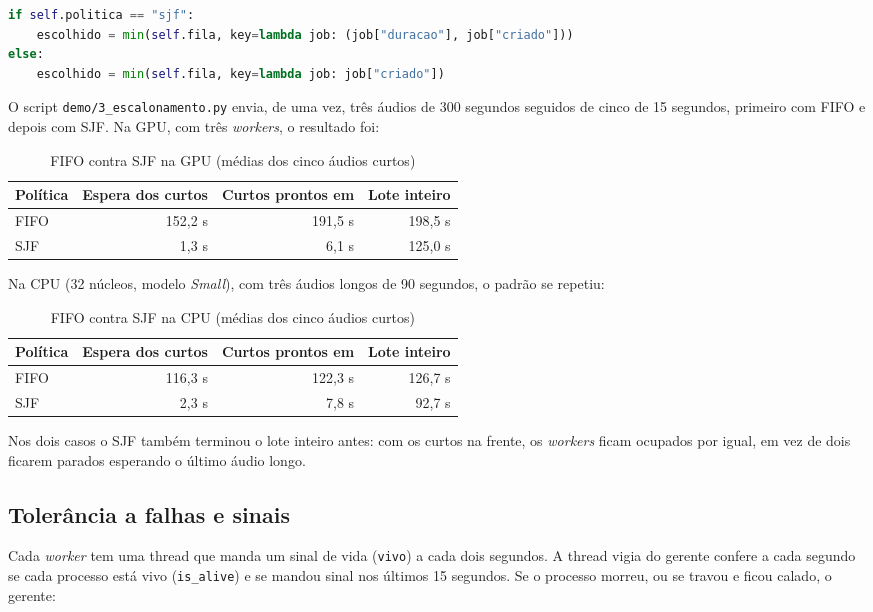 \documentclass[12pt,a4paper]{article}
\begin{document}
\begin{lstlisting}[language=Python]
if self.politica == "sjf":
    escolhido = min(self.fila, key=lambda job: (job["duracao"], job["criado"]))
else:
    escolhido = min(self.fila, key=lambda job: job["criado"])
\end{lstlisting}

O script \texttt{demo/3\_escalonamento.py} envia, de uma vez, três áudios de 300 segundos
seguidos de cinco de 15 segundos, primeiro com FIFO e depois com SJF. Na GPU, com três
\emph{workers}, o resultado foi:

\begin{table}[H]
\centering
\begin{tabular}{@{}lrrr@{}}
\toprule
\textbf{Política} & \textbf{Espera dos curtos} & \textbf{Curtos prontos em} & \textbf{Lote inteiro} \\
\midrule
FIFO & 152,2 s & 191,5 s & 198,5 s \\
SJF  &   1,3 s &   6,1 s & 125,0 s \\
\bottomrule
\end{tabular}
\caption{FIFO contra SJF na GPU (médias dos cinco áudios curtos)}
\end{table}

Na CPU (32 núcleos, modelo \emph{Small}), com três áudios longos de 90 segundos, o padrão se
repetiu:

\begin{table}[H]
\centering
\begin{tabular}{@{}lrrr@{}}
\toprule
\textbf{Política} & \textbf{Espera dos curtos} & \textbf{Curtos prontos em} & \textbf{Lote inteiro} \\
\midrule
FIFO & 116,3 s & 122,3 s & 126,7 s \\
SJF  &   2,3 s &   7,8 s &  92,7 s \\
\bottomrule
\end{tabular}
\caption{FIFO contra SJF na CPU (médias dos cinco áudios curtos)}
\end{table}

Nos dois casos o SJF também terminou o lote inteiro antes: com os curtos na frente, os
\emph{workers} ficam ocupados por igual, em vez de dois ficarem parados esperando o último
áudio longo.

\subsection{Tolerância a falhas e sinais}
Cada \emph{worker} tem uma thread que manda um sinal de vida (\texttt{vivo}) a cada dois
segundos. A thread vigia do gerente confere a cada segundo se cada processo está vivo
(\texttt{is\_alive}) e se mandou sinal nos últimos 15 segundos. Se o processo morreu, ou se
travou e ficou calado, o gerente:
\end{document}
